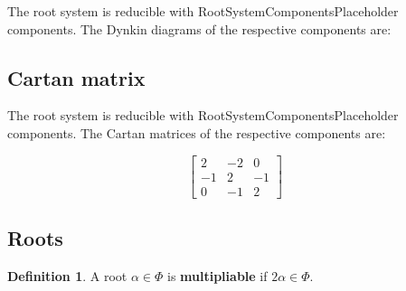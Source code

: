 \documentclass[11pt]{article}
\newcommand{\tbf}{\textbf}
\theoremstyle{definition}
\newtheorem{definition}{Definition}[section]
\newif\ifrootsystemirreducible
\begin{document}
\ifrootsystemirreducible
The root system is irreducible and has Dynkin diagram:
\else
The root system is reducible with RootSystemComponentsPlaceholder components. The Dynkin diagrams of the respective components are:
\fi

\begin{center}
\end{center}

\subsection{Cartan matrix}

\ifrootsystemirreducible
The root system is irreducible and has Cartan matrix:
\else
The root system is reducible with RootSystemComponentsPlaceholder components. The Cartan matrices of the respective components are:
\fi

\[
\left[\begin{matrix}2 & -2 & 0\\-1 & 2 & -1\\0 & -1 & 2\end{matrix}\right]
\]

\subsection{Roots}

\begin{definition}
A root $\alpha \in \Phi$ is \tbf{multipliable} if $2\alpha \in \Phi$.
\end{definition}
\end{document}
